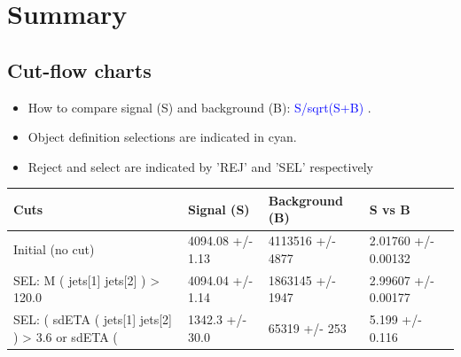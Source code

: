 \documentclass[a4paper, 10pt]{article}
\begin{document}
\newpage
\section{ Summary}

\subsection{Cut-flow charts}

\begin{itemize}
  \item How to compare signal (S) and background (B): \textcolor{blue}{S/\-sqrt(S+B)} .
   \item Object definition selections are indicated in cyan.  \item Reject and select are indicated by 'REJ' and 'SEL' respectively
\end{itemize}
\begin{table}[H]
  \begin{center}
    \begin{tabular}{|m{36.0mm}|m{36.0mm}|m{36.0mm}|m{33.0mm}|}
      \hline
      {\cellcolor{yellow}        Cuts}& {\cellcolor{yellow}         Signal (S)}& {\cellcolor{yellow}         Background (B)}& {\cellcolor{yellow}         S vs B}\\
      \hline
      {\cellcolor{white}         Initial (no cut)}& {\cellcolor{white}         4094.08 +/\-- 1.13}& {\cellcolor{white}         4113516 +/\-- 4877}& {\cellcolor{white}         2.01760 +/\-- 0.00132}\\
      \hline
      {\cellcolor{white} SEL: M ( jets[1] jets[2] ) > 120.0}& {\cellcolor{white}         4094.04 +/\-- 1.14}& {\cellcolor{white}         1863145 +/\-- 1947}& {\cellcolor{white}         2.99607 +/\-- 0.00177}\\
      \hline
      {\cellcolor{white} SEL: ( sdETA ( jets[1] jets[2] ) > 3.6 or sdETA ( }& {\cellcolor{white}         1342.3 +/\-- 30.0}& {\cellcolor{white}         65319 +/\-- 253}& {\cellcolor{white}         5.199 +/\-- 0.116}\\
\hline
    \end{tabular}
  \end{center}
\end{table}
\end{document}
